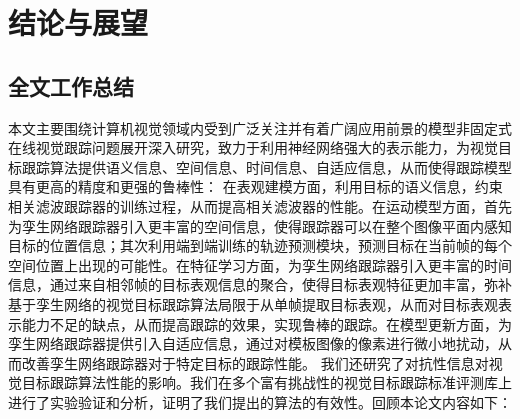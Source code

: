 \chapter{结论与展望}\label{chap:conclusion}
\section{全文工作总结}
本文主要围绕计算机视觉领域内受到广泛关注并有着广阔应用前景的模型非固定式在线视觉跟踪问题展开深入研究，致力于利用神经网络强大的表示能力，为视觉目标跟踪算法提供语义信息、空间信息、时间信息、自适应信息，从而使得跟踪模型具有更高的精度和更强的鲁棒性：
在表观建模方面，利用目标的语义信息，约束相关滤波跟踪器的训练过程，从而提高相关滤波器的性能。在运动模型方面，首先为孪生网络跟踪器引入更丰富的空间信息，使得跟踪器可以在整个图像平面内感知目标的位置信息；其次利用端到端训练的轨迹预测模块，预测目标在当前帧的每个空间位置上出现的可能性。在特征学习方面，为孪生网络跟踪器引入更丰富的时间信息，通过来自相邻帧的目标表观信息的聚合，使得目标表观特征更加丰富，弥补基于孪生网络的视觉目标跟踪算法局限于从单帧提取目标表观，从而对目标表观表示能力不足的缺点，从而提高跟踪的效果，实现鲁棒的跟踪。在模型更新方面，为孪生网络跟踪器提供引入自适应信息，通过对模板图像的像素进行微小地扰动，从而改善孪生网络跟踪器对于特定目标的跟踪性能。
我们还研究了对抗性信息对视觉目标跟踪算法性能的影响。我们在多个富有挑战性的视觉目标跟踪标准评测库上进行了实验验证和分析，证明了我们提出的算法的有效性。回顾本论文内容如下：
